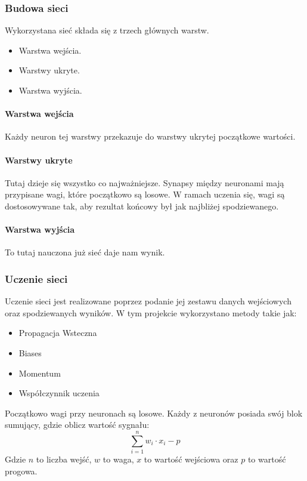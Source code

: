 \documentclass[12pt,a4paper]{article}
\begin{document}
\subsubsection{Budowa sieci}
Wykorzystana sieć składa się z trzech głównych warstw.
\begin{itemize}
	\item Warstwa wejścia.
	\item Warstwy ukryte.
	\item Warstwa wyjścia.
\end{itemize}
\paragraph*{Warstwa wejścia} Każdy neuron tej warstwy przekazuje do warstwy ukrytej początkowe wartości.
\paragraph*{Warstwy ukryte} Tutaj dzieje się wszystko co najważniejsze. Synapsy między neuronami mają przypisane wagi, które początkowo są losowe. W ramach uczenia się, wagi są dostosowywane tak, aby rezultat końcowy był jak najbliżej spodziewanego.
\paragraph*{Warstwa wyjścia} To tutaj nauczona już sieć daje nam wynik.
\subsubsection{Uczenie sieci}
Uczenie sieci jest realizowane poprzez podanie jej zestawu danych wejściowych oraz spodziewanych wyników. W tym projekcie wykorzystano metody takie jak:
\begin{itemize}
\item Propagacja Wsteczna
\item Biases
\item Momentum
\item Współczynnik uczenia
\end{itemize}

Początkowo wagi przy neuronach są losowe. Każdy z neuronów posiada swój blok sumujący, gdzie oblicz wartość sygnału:
$$ \sum_{i=1}^{n}{w_i\cdot x_i - p} $$
Gdzie $n$ to liczba wejść, $w$ to waga, $x$ to wartość wejściowa oraz $p$ to wartość progowa.
\end{document}
